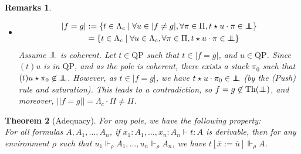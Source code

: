 \documentclass[a4paper,12pt]{article}
\newtheorem{theo}{Theorem}[subsection]
\theoremstyle{rmqstyle}
\newtheorem{rmqs}[theo]{Remarks}
\newcommand{\set}[1]{\{#1\}}
\newcommand{\abs}[1]{\lvert#1\rvert}
\newcommand{\abss}[1]{\lvert \lvert#1\rvert \rvert}
\newcommand{\QP}{\mathrm{QP}}
\newcommand{\pole}{{\protect\mathpalette{\protect\polehelper}{\bot}}} \def\polehelper#1#2{\mathrel{\rlap{$#1#2$}\mkern3mu{#1#2}}}
\newcommand{\Th}{\mathrm{Th}}
\renewcommand{\bar}{\overline}
\begin{document}
\begin{rmqs}
\begin{itemize}
\begin{itemize}
\item \begin{align*}
\abs{f = g} &:= \set{ t \in \Lambda_c \mid \forall u \in \abs{f \neq g}, \forall \pi \in \Pi, t \star u \cdot \pi \in \pole}\\
& =  \set{ t \in \Lambda_c \mid \forall u \in \Lambda_c, \forall \pi \in \Pi, t \star u \cdot \pi \in \pole}
\end{align*}
Assume $\pole$ is coherent. Let $t \in \QP$ such that $t \in \abs{f = g}$, and $u \in \QP$. Since $(t)u$ is in $\QP$, and as the pole is coherent, there exists a stack $\pi_0$ such that $(t)u \star \pi_0 \not \in \pole$. However, as $t \in \abs{f = g}$, we have $t \star u \cdot \pi_0 \in \pole$ (by the \textit{(Push)} rule and saturation). This leads to a contradiction, so $f = g \not \in \Th(\pole)$, and moreover, $\abss{f = g} = \Lambda_c \cdot \Pi \neq \Pi$.
\end{itemize}
\end{itemize}
\end{rmqs}

\begin{theo}[Adequacy]
\label{ade}
For any pole, we have the following property:\\
For all formulas $A, A_1, \dots, A_n$, if $x_1 : A_1, \dots, x_n : A_n \vdash t : A$ is derivable, then for any environment $\rho$ such that $u_1 \Vdash_\rho A_1,  \dots, u_n \Vdash_\rho A_n$, we have $t[ \bar{x} := \bar{u}] \Vdash_\rho A$.
\end{theo}
\end{document}
